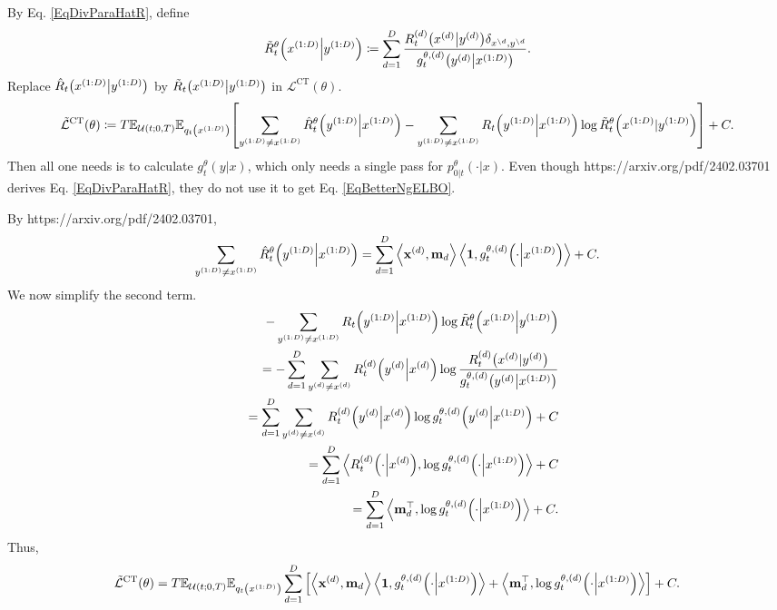 \documentclass[10pt]{article}
\begin{document}
By Eq. \eqref{EqDivParaHatR}, define
\begin{eqnarray}
  \tilde{R}^\theta_t\qty(x^{(1:D)}\middle|y^{(1:D)})\coloneq\sum_{d=1}^D \frac{R^{(d)}_t\qty(x^{(d)}\middle| y^{(d)})\delta_{x^{\setminus d},y^{\setminus d}}}{g^{\theta,(d)}_t\qty(y^{(d)}\middle|x^{(1:D)})}.
\end{eqnarray}
Replace $\hat{R}_t\qty(x^{(1:D)}\middle|y^{(1:D)})$ by $\tilde{R}_t\qty(x^{(1:D)}\middle|y^{(1:D)})$ in $\mathcal{L}^\text{CT}(\theta)$.
\begin{eqnarray}\label{EqBetterNgELBO}
  \tilde{\mathcal{L}}^\text{CT}(\theta)\coloneq T\mathbb{E}_{\mathcal{U}(t;0,T)}\mathbb{E}_{q_t\qty(x^{(1:D)})}\qty[\sum_{y^{(1:D)}\neq x^{(1:D)}}\hat{R}_t^\theta\qty(y^{(1:D)}\middle|x^{(1:D)}) - \sum_{y^{(1:D)}\neq x^{(1:D)}}R_t\qty(y^{(1:D)}\middle|x^{(1:D)})\log\tilde{R}_t^\theta\qty(x^{(1:D)}|y^{(1:D)})] + C.
\end{eqnarray}
Then all one needs is to calculate $g^\theta_t(y|x)$, which only needs a single pass for $p^\theta_{0|t}(\cdot|x)$. Even though https://arxiv.org/pdf/2402.03701 derives Eq. \eqref{EqDivParaHatR}, they do not use it to get Eq. \eqref{EqBetterNgELBO}.

By https://arxiv.org/pdf/2402.03701,
\begin{eqnarray*}
  \sum_{y^{(1:D)}\neq x^{(1:D)}}\hat{R}_t^\theta\qty(y^{(1:D)}\middle|x^{(1:D)})=\sum_{d=1}^D\left\langle\mathbf{x}^{(d)},\mathbf{m}_d\right\rangle\left\langle\mathbf{1},g^{\theta,(d)}_t\qty(\cdot\middle|x^{(1:D)})\right\rangle + C.
\end{eqnarray*}
We now simplify the second term.
\begin{eqnarray*}
  &&- \sum_{y^{(1:D)}\neq x^{(1:D)}}R_t\qty(y^{(1:D)}\middle|x^{(1:D)})\log\tilde{R}_t^\theta\qty(x^{(1:D)}\middle|y^{(1:D)})\\
  &&=-\sum_{d=1}^D\sum_{y^{(d)}\neq x^{(d)}}R^{(d)}_t\qty(y^{(d)}\middle|x^{(d)})\log\frac{R_t^{(d)}\qty(x^{(d)}|y^{(d)})}{g^{\theta,(d)}_t\qty(y^{(d)}\middle|x^{(1:D)})}\\
  &&=\sum_{d=1}^D\sum_{y^{(d)}\neq x^{(d)}}R^{(d)}_t\qty(y^{(d)}\middle|x^{(d)})\log g^{\theta,(d)}_t\qty(y^{(d)}\middle|x^{(1:D)}) + C\\
  &&=\sum_{d=1}^D \left\langle R^{(d)}_t\qty(\cdot\middle|x^{(d)}),\log g^{\theta,(d)}_t\qty(\cdot\middle|x^{(1:D)})\right\rangle + C\\
  &&=\sum_{d=1}^D \left\langle \mathbf{m}_d^\top,\log g^{\theta,(d)}_t\qty(\cdot\middle|x^{(1:D)})\right\rangle + C.
\end{eqnarray*}
Thus,
\begin{eqnarray*}
  \tilde{\mathcal{L}}^\text{CT}(\theta)=T\mathbb{E}_{\mathcal{U}(t;0,T)}\mathbb{E}_{q_t\qty(x^{(1:D)})}\sum_{d=1}^D\qty[\left\langle\mathbf{x}^{(d)},\mathbf{m}_d\right\rangle\left\langle\mathbf{1},g^{\theta,(d)}_t\qty(\cdot\middle|x^{(1:D)})\right\rangle + \left\langle \mathbf{m}_d^\top,\log g^{\theta,(d)}_t\qty(\cdot\middle|x^{(1:D)})\right\rangle] + C.
\end{eqnarray*}
\end{document}
